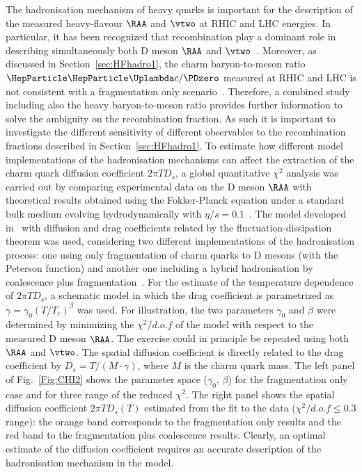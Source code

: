 The hadronisation mechanism of heavy quarks is important for the description of the measured
heavy-flavour $\RAA$ and $\vtwo$ at RHIC and LHC energies. In particular, it has been recognized that recombination
play a dominant role in describing simultaneously both D meson $\RAA$ and $\vtwo$~\cite{Gossiaux:2008jv,He:2011qa,Scardina:2017ipo}.
Moreover, as discussed in Section~\ref{sec:HFhadro1}, the charm baryon-to-meson ratio $\PGLc/\PDzero$ measured at RHIC and LHC is not consistent with a fragmentation only scenario~\cite{Oh:2009zj,Plumari:2017ntm}.
Therefore, a combined study including also the heavy baryon-to-meson ratio provides further
information to solve the ambiguity on the
recombination fraction. As such it is important to investigate the different sensitivity
of different observables to the
recombination fractions described in Section~\ref{sec:HFhadro1}.
To estimate how different model implementations of the hadronisation mechanisms can affect the extraction of the charm quark diffusion coefficient $2\pi T D_s$,
a global quantitative $\chi^2$ analysis was carried out by comparing experimental data on the D meson $\RAA$ with theoretical
results obtained using the Fokker-Planck equation under a standard bulk medium evolving
hydrodynamically with $\eta/s=0.1$~\cite{Plumari:2015cfa,Ruggieri:2013ova}.
The model developed in~\cite{Das:2015ana,Das:2013kea} with diffusion and drag
coefficients related by the fluctuation-dissipation theorem was used, considering two different
implementations of the hadronisation process: one using only fragmentation of charm quarks to D mesons (with the Peterson function)
and another one including a hybrid hadronisation by coalescence plus fragmentation~\cite{Plumari:2017ntm,Scardina:2017ipo}.
For the estimate of the temperature dependence of $2\pi T D_s$, a schematic model in which the
drag coefficient is parametrized as $\gamma=\gamma_0 (T/T_{c})^{\beta}$ was used. For illustration, the two parameters $\gamma_0$ and $\beta$ were determined by minimizing the
$\chi^2/d.o.f$ of the model with respect to the measured D meson $\RAA$. The exercise could in principle be repeated using both $\RAA$ and $\vtwo$. 
The spatial diffusion coefficient is directly related to
the drag coefficient by $D_s=T/(M\cdot\gamma)$, where $M$ is the charm quark mass.
The left panel of Fig.~\ref{Fig:CHI2} shows the parameter space ($\gamma_0,\, \beta$) for the fragmentation only case and for three range of the reduced $\chi^2$. The right
panel shows the spatial diffusion coefficient $2\pi T D_s(T)$ estimated from the fit to the data ($\chi^2/d.o.f \leq 0.3$ range): the orange band corresponds to the fragmentation only 
results and the red band to the fragmentation plus coalescence results. Clearly, an optimal estimate of the diffusion coefficient requires an accurate description of the hadronisation mechanism in the model.



